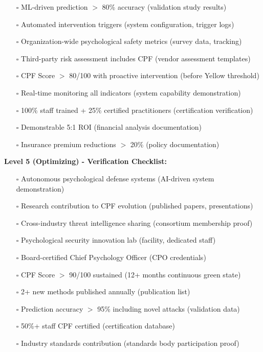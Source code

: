 \documentclass[11pt,a4paper]{article}
\begin{document}
\begin{itemize}
\item[$\square$] ML-driven prediction $>$ 80\% accuracy (validation study results)
\item[$\square$] Automated intervention triggers (system configuration, trigger logs)
\item[$\square$] Organization-wide psychological safety metrics (survey data, tracking)
\item[$\square$] Third-party risk assessment includes CPF (vendor assessment templates)
\item[$\square$] CPF Score $>$ 80/100 with proactive intervention (before Yellow threshold)
\item[$\square$] Real-time monitoring all indicators (system capability demonstration)
\item[$\square$] 100\% staff trained + 25\% certified practitioners (certification verification)
\item[$\square$] Demonstrable 5:1 ROI (financial analysis documentation)
\item[$\square$] Insurance premium reductions $>$ 20\% (policy documentation)
\end{itemize}

\textbf{Level 5 (Optimizing) - Verification Checklist:}

\begin{itemize}
\item[$\square$] Autonomous psychological defense systems (AI-driven system demonstration)
\item[$\square$] Research contribution to CPF evolution (published papers, presentations)
\item[$\square$] Cross-industry threat intelligence sharing (consortium membership proof)
\item[$\square$] Psychological security innovation lab (facility, dedicated staff)
\item[$\square$] Board-certified Chief Psychology Officer (CPO credentials)
\item[$\square$] CPF Score $>$ 90/100 sustained (12+ months continuous green state)
\item[$\square$] 2+ new methods published annually (publication list)
\item[$\square$] Prediction accuracy $>$ 95\% including novel attacks (validation data)
\item[$\square$] 50\%+ staff CPF certified (certification database)
\item[$\square$] Industry standards contribution (standards body participation proof)
\end{itemize}
\end{document}
